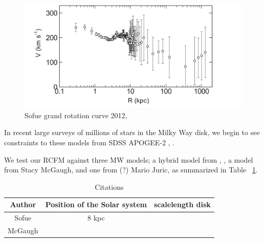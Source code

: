 \documentclass[reprint,%
 amsmath,amssymb,
 aps,
]{revtex4-1}
\begin{document}
 \begin{figure}
    \centering
    \includegraphics[width=\linewidth]{Sofue_MWtoLGData}
    \caption{Sofue grand rotation curve 2012, }
    \label{fig:mwSofue}
\end{figure}

  In  recent large surveys of millions of  stars in the Milky Way disk,  we begin to see  constraints to these models from  SDSS APOGEE-2 \citet{2022ApJS..259...35A}, \citet{2010ApJ...716....1B}.
  
  We test our RCFM against three MW models;  a hybrid model from \cite{Xue}, \cite{Sofue}, a model from Stacy McGaugh, and one from (?) Mario Juric, as summarized in Table ~\ref{tab:my_label}.
   \begin{table}[h!]
      \centering
      \begin{tabular}{|c|c|c|}
        Author & Position of the Solar system   &  scalelength disk\\
        \hline
        Sofue \cite{Sof11}   & 8 kpc &\\
             \hline
        McGaugh\cite{2021DDA....5240103M} & &
      \end{tabular}
      \caption{Citations}
      \label{tab:my_label}
  \end{table}
  
\end{document}
